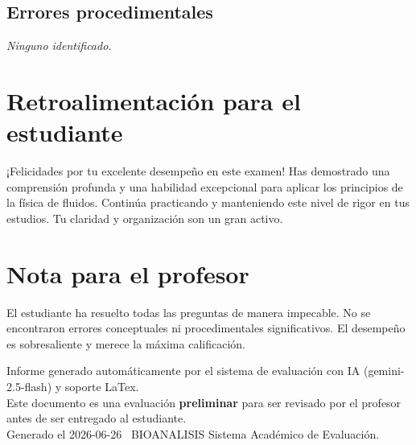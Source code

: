 \documentclass[11pt,a4paper]{article}
\begin{document}
\subsection*{Errores procedimentales}
\textit{Ninguno identificado.}

\section*{Retroalimentación para el estudiante}
\begin{tcolorbox}[cajaRecomendacion, title={Dirigido a: mariana rojas 33386743}]
¡Felicidades por tu excelente desempeño en este examen! Has demostrado una comprensión profunda y una habilidad excepcional para aplicar los principios de la física de fluidos. Continúa practicando y manteniendo este nivel de rigor en tus estudios. Tu claridad y organización son un gran activo.
\end{tcolorbox}

\section*{Nota para el profesor}
\begin{tcolorbox}[
  enhanced, breakable,
  colback=yellow!8, colframe=yellow!60!black,
  fonttitle=\bfseries, coltitle=black,
  title={Observaciones para revisión manual},
  top=4pt, bottom=4pt, left=8pt, right=8pt,
]
El estudiante ha resuelto todas las preguntas de manera impecable. No se encontraron errores conceptuales ni procedimentales significativos. El desempeño es sobresaliente y merece la máxima calificación.
\end{tcolorbox}

\vspace{12pt}
\begin{center}
  \footnotesize\color{gray}
  Informe generado automáticamente por el sistema de evaluación con IA (gemini-2.5-flash) y soporte LaTex. \\
  Este documento es una evaluación \textbf{preliminar} para ser revisado por el profesor antes de ser entregado al 
  estudiante. \\
  Generado el 2026-06-26 \textbullet\ BIOANALISIS Sistema Académico de Evaluación.
  \end{center}
\end{document}
